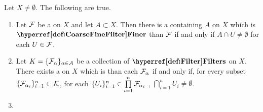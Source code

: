 \begin{prop}
    \label{prop:FilterOrderFacts}
    Let $X \neq \emptyset$. The following are true. 
    \begin{enumerate}[label=(\roman*), ref={\ref{prop:FilterOrderFacts}.~\roman*}]
    \item \label{prop:FilterOrderFacts:ContainingFilter} Let $\mathcal{F}$ be a \Filter on $X$ and let $A \subset X$. Then there is a \Filter containing $A$ on $X$ which is $\FinerFilter$ than $\mathcal{F}$ if and only if $A \cap U \neq \emptyset$ for each $U \in \mathcal{F}$. 
    \item \label{prop:FilterOrderFacts:FinestFilterExistence}
    Let $\sc{K}=\{\mathcal{F}_\alpha\}_{\alpha \in A}$ be a collection of $\Filters$ on $X$. 
    There exists a \Filter on $X$ which is \FinerFilter than each $\mathcal{F}_\alpha$ if and only if, for every \Finite subset $\{\mathcal{F}_{\alpha_i}\}_{i=1}^n \subset \mathcal{K}$, 
    for each $\{U_i\}_{i=1}^n \in \prod\limits_{i=1}^n \mathcal{F}_{\alpha_i}$
    , $\bigcap\limits_{i=1}^n U_i \neq \emptyset$.
    \item \label{prop:FilterOrderFacts:FiltersAreInductive}

    \end{enumerate}
\end{prop}
